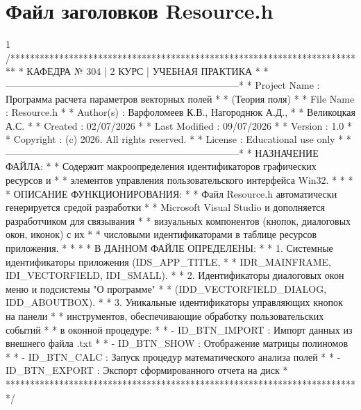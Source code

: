 \section{Файл заголовков Resource.h}
\footnotesize
\begin{listing}{1}
/*************************************************************************
* КАФЕДРА № 304 | 2 КУРС | УЧЕБНАЯ ПРАКТИКА                             *
*------------------------------------------------------------------------*
* Project Name  : Программа расчета параметров векторных полей           *
* (Теория поля)                                                          *
* File Name     : Resource.h                                             *
* Author(s)     : Варфоломеев К.В., Нагороднюк А.Д.,                     *
*                 Великоцкая А.С.                                        *
* Created       : 02/07/2026                                             *
* Last Modified : 09/07/2026                                             *
* Version       : 1.0                                                    *
* Copyright     : (c) 2026. All rights reserved.                         *
* License       : Educational use only                                   *
*------------------------------------------------------------------------*
* НАЗНАЧЕНИЕ ФАЙЛА:                                                      *
* Содержит макроопределения идентификаторов графических ресурсов и       *
* элементов управления пользовательского интерфейса Win32.               *
*                                                                        *
* ОПИСАНИЕ ФУНКЦИОНИРОВАНИЯ:                                             *
* Файл Resource.h автоматически генерируется средой разработки           *
* Microsoft Visual Studio и дополняется разработчиком для связывания     *
* визуальных компонентов (кнопок, диалоговых окон, иконок) с их          *
* числовыми идентификаторами в таблице ресурсов приложения.              *
*                                                                        *
* В ДАННОМ ФАЙЛЕ ОПРЕДЕЛЕНЫ:                                             *
* 1. Системные идентификаторы приложения (IDS_APP_TITLE,                 *
* IDR_MAINFRAME, IDI_VECTORFIELD, IDI_SMALL).                            *
* 2. Идентификаторы диалоговых окон меню и подсистемы "О программе"      *
* (IDD_VECTORFIELD_DIALOG, IDD_ABOUTBOX).                                *
* 3. Уникальные идентификаторы управляющих кнопок на панели              *
* инструментов, обеспечивающие обработку пользовательских событий        *
* в оконной процедуре:                                                   *
* - ID_BTN_IMPORT : Импорт данных из внешнего файла .txt                 *
* - ID_BTN_SHOW   : Отображение матрицы полиномов                        *
* - ID_BTN_CALC   : Запуск процедур математического анализа полей        *
* - ID_BTN_EXPORT : Экспорт сформированного отчета на диск               *
*************************************************************************/


\end{listing}

